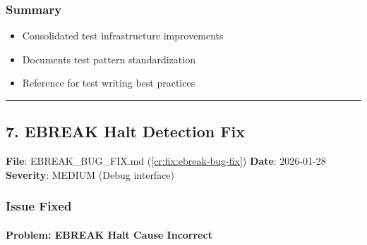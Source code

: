 \subsubsection{Summary}\label{cr:fix:fixes-index:summary}

\begin{record}

\begin{itemize}
\tightlist
\item
  Consolidated test infrastructure improvements
\item
  Documents test pattern standardization
\item
  Reference for test writing best practices
\end{itemize}

\begin{center}\rule{0.5\linewidth}{0.5pt}\end{center}

\end{record}

\subsection{7. EBREAK Halt Detection Fix}\label{cr:fix:fixes-index:7-ebreak-halt-detection-fix}

\begin{record}

\textbf{File}:
EBREAK\_\allowbreak{}BUG\_\allowbreak{}FIX.md (\cref{cr:fix:ebreak-bug-fix})
\textbf{Date}: 2026-01-28 \textbf{Severity}: \partialmark{} MEDIUM
(Debug interface)

\end{record}

\subsubsection{Issue Fixed}\label{cr:fix:fixes-index:issue-fixed}

\paragraph{Problem: EBREAK Halt Cause Incorrect}\label{cr:fix:fixes-index:problem-ebreak-halt-cause-incorrect}

